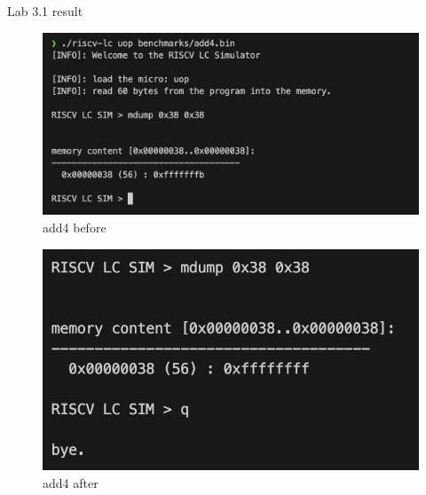 \documentclass[12pt, a4paper]{article}
\begin{document}
\begin{qNoMark}
Lab 3.1 result
\end{qNoMark}

\begin{ans}
    \begin{figure}[H]
        \caption{add4 before}
        \includegraphics[width=1\linewidth]{../figs/add4-before-1.png}
    \end{figure}
    \begin{figure}[H]
        \caption{add4 after}
        \includegraphics[width=1\linewidth]{../figs/add4-after-1.png}
    \end{figure}
    

\end{ans}
\end{document}
